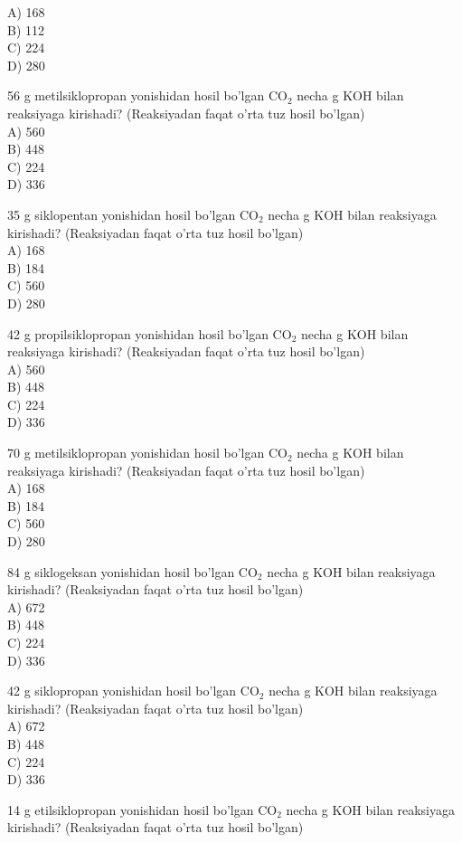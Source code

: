 A) 168\\
B) 112\\
C) 224\\
D) 280
  \item 56 g metilsiklopropan yonishidan hosil bo'lgan $\mathrm{CO}_{2}$ necha g KOH bilan reaksiyaga kirishadi? (Reaksiyadan faqat o'rta tuz hosil bo'lgan)\\
A) 560\\
B) 448\\
C) 224\\
D) 336
  \item 35 g siklopentan yonishidan hosil bo'lgan $\mathrm{CO}_{2}$ necha g KOH bilan reaksiyaga kirishadi? (Reaksiyadan faqat o'rta tuz hosil bo'lgan)\\
A) 168\\
B) 184\\
C) 560\\
D) 280
  \item 42 g propilsiklopropan yonishidan hosil bo'lgan $\mathrm{CO}_{2}$ necha g KOH bilan reaksiyaga kirishadi? (Reaksiyadan faqat o'rta tuz hosil bo'lgan)\\
A) 560\\
B) 448\\
C) 224\\
D) 336
  \item 70 g metilsiklopropan yonishidan hosil bo'lgan $\mathrm{CO}_{2}$ necha g KOH bilan reaksiyaga kirishadi? (Reaksiyadan faqat o'rta tuz hosil bo'lgan)\\
A) 168\\
B) 184\\
C) 560\\
D) 280
  \item 84 g siklogeksan yonishidan hosil bo'lgan $\mathrm{CO}_{2}$ necha g KOH bilan reaksiyaga kirishadi? (Reaksiyadan faqat o'rta tuz hosil bo'lgan)\\
A) 672\\
B) 448\\
C) 224\\
D) 336
  \item 42 g siklopropan yonishidan hosil bo'lgan $\mathrm{CO}_{2}$ necha g KOH bilan reaksiyaga kirishadi? (Reaksiyadan faqat o'rta tuz hosil bo'lgan)\\
A) 672\\
B) 448\\
C) 224\\
D) 336
  \item 14 g etilsiklopropan yonishidan hosil bo'lgan $\mathrm{CO}_{2}$ necha g KOH bilan reaksiyaga kirishadi? (Reaksiyadan faqat o'rta tuz hosil bo'lgan)\\
